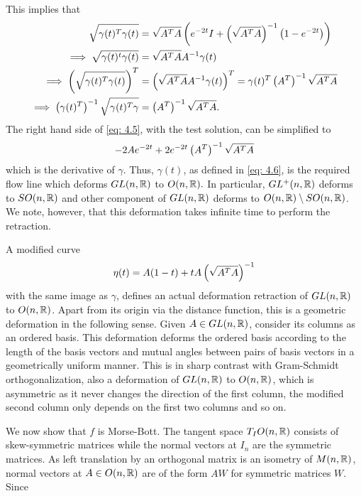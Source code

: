 \noindent This implies that 
\begin{align*}
    \sqrt{\gamma(t)^T\gamma(t)} & = \sqrt{A^TA}\left( e^{-2t}I+\left( \sqrt{A^TA} \right)^{-1} \left( 1-e^{-2t} \right) \right)\nonumber\\
    \implies \sqrt{\gamma(t)^t\gamma(t)} & = \sqrt{A^TA}A^{-1}\gamma(t)\nonumber\\
    \implies \left( \sqrt{\gamma(t)^T\gamma(t)} \right)^T & = \left( \sqrt{A^TA}A^{-1}\gamma(t) \right)^T = \gamma(t)^T\left( A^T \right)^{-1} \sqrt{A^TA}\nonumber\\
    \implies \left( \gamma(t)^T \right)^{-1} \sqrt{\gamma(t)^T\gamma} & = \left( A^T \right)^{-1}\sqrt{A^TA}.
\end{align*}
\noindent The right hand side of \eqref{eq: 4.5}, with the test solution, can be simplified to 
\begin{displaymath}
-2Ae^{-2t} + 2e^{-2t}\left( A^T \right)^{-1} \sqrt{A^TA}
\end{displaymath}
which is the derivative of $\gamma$. Thus, $\gamma(t)$, as defined in \eqref{eq: 4.6}, is the required flow line which deforms $GL(n,\mathbb{R})$ to $O(n,\mathbb{R}).$ In particular, $GL^+(n,\mathbb{R})$ deforms to $SO(n,\mathbb{R})$ and other component of $GL(n,\mathbb{R})$ deforms to $O(n,\mathbb{R})\setminus SO(n,\mathbb{R})$. We note, however, that this deformation takes infinite time to perform the retraction.
\begin{rem}
A modified curve
\begin{equation}\label{GLdefOver1}
\eta(t)=A(1-t)+tA\left( \sqrt{A^TA} \right)^{-1}
\end{equation}
with the same image as $\gamma$, defines an actual deformation retraction of $GL(n,\mathbb{R})$ to $O(n,\mathbb{R})$. Apart from its origin via the distance function, this is a geometric deformation in the following sense. Given $A\in GL(n,\mathbb{R})$, consider its columns as an ordered basis. This deformation deforms the ordered basis according to the length of the basis vectors and mutual angles between pairs of basis vectors in a geometrically uniform manner. This is in sharp contrast with Gram-Schmidt orthogonalization, also a deformation of $GL(n,\mathbb{R})$ to $O(n,\mathbb{R})$, which is asymmetric as it never changes the direction of the first column, the modified second column only depends on the first two columns and so on.
\end{rem}
\hspace*{0.5cm}We now show that $f$ is Morse-Bott. The tangent space $T_I O(n,\mathbb{R})$ consists of skew-symmetric matrices while the normal vectors at $I_n$ are the symmetric matrices. As left translation by an orthogonal matrix is an isometry of $M(n,\mathbb{R})$, normal vectors at $A\in O(n,\mathbb{R})$ are of the form $AW$ for symmetric matrices $W$. Since 
